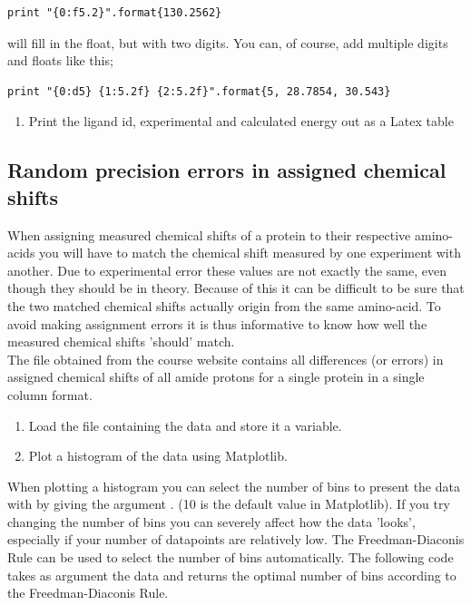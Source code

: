 \documentclass{article}
\begin{document}
\begin{lstlisting}
print "{0:f5.2}".format{130.2562}
\end{lstlisting}

will fill in the float, but with two digits.
You can, of course, add multiple digits and floats like this;

\begin{lstlisting}
print "{0:d5} {1:5.2f} {2:5.2f}".format{5, 28.7854, 30.543}
\end{lstlisting}


\begin{enumerate}[resume]

    \item Print the ligand id, experimental and calculated energy out as a Latex table

\end{enumerate}


\newpage
\subsection{Random precision errors in assigned chemical shifts}

When assigning measured chemical shifts of a protein to their respective amino-acids you will have to match the chemical shift measured by one experiment with another.
Due to experimental error these values are not exactly the same, even though they should be in theory.
Because of this it can be difficult to be sure that the two matched chemical shifts actually origin from the same amino-acid.
To avoid making assignment errors it is thus informative to know how well the measured chemical shifts 'should' match.\\

The file  obtained from the course website contains all differences (or errors) in assigned chemical shifts of all amide protons for a single protein in a single column format.


\begin{enumerate}

    \item Load the file containing the data and store it a variable.

    \item Plot a histogram of the data using Matplotlib.

\end{enumerate}

When plotting a histogram you can select the number of bins to present the data with by giving the argument . (10 is the default value in Matplotlib).
If you try changing the number of bins you can severely affect how the data 'looks', especially if your number of datapoints are relatively low.
The Freedman-Diaconis Rule can be used to select the number of bins automatically.
The following code takes as argument the data and returns the optimal number of bins according to the Freedman-Diaconis Rule.
\end{document}
